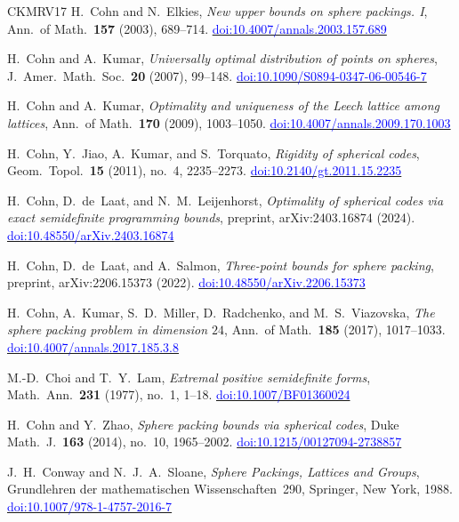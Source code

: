 \documentclass[11pt,reqno]{amsart}
\newcommand{\bluelink}[2]{\href{#1}{\textcolor{blue}{#2}}}
\renewcommand{\_}{\origunderscore\allowbreak}
\numberwithin{equation}{section}
\theoremstyle{plain}
\theoremstyle{definition}
\theoremstyle{remark}
\begin{document}
\begin{thebibliography}{CKMRV17}
H.~Cohn and N.~Elkies,
\textit{New upper bounds on sphere packings. {I}},
Ann.\ of Math.\ \textbf{157} (2003), 689--714.
\bluelink{https://doi.org/10.4007/annals.2003.157.689}{doi:10.4007/annals.2003.157.689}

H.~Cohn and A.~Kumar,
\textit{Universally optimal distribution of points on spheres},
J.\ Amer.\ Math.\ Soc.\ \textbf{20} (2007), 99--148.
\bluelink{https://doi.org/10.1090/S0894-0347-06-00546-7}{doi:10.1090/S0894-0347-06-00546-7}

H.~Cohn and A.~Kumar,
\textit{Optimality and uniqueness of the {L}eech lattice among lattices},
Ann.\ of Math.\ \textbf{170} (2009), 1003--1050.
\bluelink{https://doi.org/10.4007/annals.2009.170.1003}{doi:10.4007/annals.2009.170.1003}

H.~Cohn, Y.~Jiao, A.~Kumar, and S.~Torquato,
\textit{Rigidity of spherical codes},
Geom.\ Topol.\ \textbf{15} (2011), no.~4, 2235--2273.
\bluelink{https://doi.org/10.2140/gt.2011.15.2235}{doi:10.2140/gt.2011.15.2235}

H.~Cohn, D.~de~Laat, and N.~M.~Leijenhorst,
\textit{Optimality of spherical codes via exact semidefinite programming
bounds},
preprint, arXiv:2403.16874 (2024).
\bluelink{https://doi.org/10.48550/arXiv.2403.16874}{doi:10.48550/arXiv.2403.16874}

H.~Cohn, D.~de~Laat, and A.~Salmon,
\textit{Three-point bounds for sphere packing},
preprint, arXiv:2206.15373 (2022).
\bluelink{https://doi.org/10.48550/arXiv.2206.15373}{doi:10.48550/arXiv.2206.15373}

H.~Cohn, A.~Kumar, S.~D.~Miller, D.~Radchenko, and M.~S.~Viazovska,
\textit{The sphere packing problem in dimension $24$},
Ann.\ of Math.\ \textbf{185} (2017), 1017--1033.
\bluelink{https://doi.org/10.4007/annals.2017.185.3.8}{doi:10.4007/annals.2017.185.3.8}

M.-D.~Choi and T.~Y.~Lam,
\textit{Extremal positive semidefinite forms},
Math.\ Ann.\ \textbf{231} (1977), no.~1, 1--18.
\bluelink{https://doi.org/10.1007/BF01360024}{doi:10.1007/BF01360024}

H.~Cohn and Y.~Zhao,
\textit{Sphere packing bounds via spherical codes},
Duke Math.\ J.\ \textbf{163} (2014), no.~10, 1965--2002.
\bluelink{https://doi.org/10.1215/00127094-2738857}{doi:10.1215/00127094-2738857}

J.~H.~Conway and N.~J.~A.~Sloane,
\textit{Sphere Packings, Lattices and Groups},
Grundlehren der mathematischen Wissenschaften~290,
Springer, New York, 1988.
\bluelink{https://doi.org/10.1007/978-1-4757-2016-7}{doi:10.1007/978-1-4757-2016-7}


\end{thebibliography}
\end{document}
